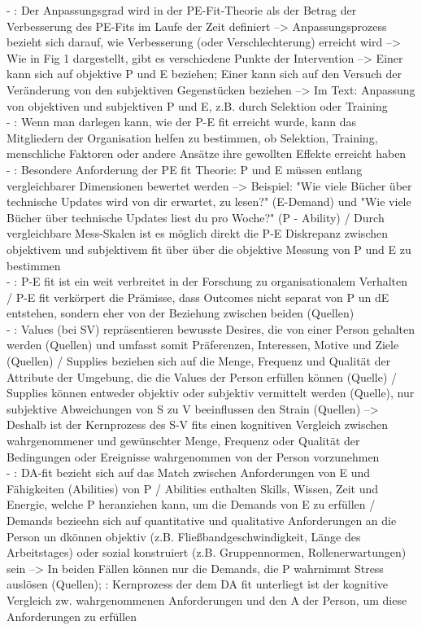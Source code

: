 - \cite[S. 4]{caplan:1987}: Der Anpassungsgrad wird in der PE-Fit-Theorie als der Betrag der Verbesserung des PE-Fits im Laufe der Zeit definiert --> Anpassungsprozess bezieht sich darauf, wie Verbesserung (oder Verschlechterung) erreicht wird --> Wie in Fig 1 dargestellt, gibt es verschiedene Punkte der Intervention --> Einer kann sich auf objektive P und E beziehen; Einer kann sich auf den Versuch der Veränderung von den subjektiven Gegenstücken beziehen --> Im Text: Anpassung von objektiven und subjektiven P und E, z.B. durch Selektion oder Training \\
- \cite[S. 4]{caplan:1987}: Wenn man darlegen kann, wie der P-E fit erreicht wurde, kann das Mitgliedern der Organisation helfen zu bestimmen, ob Selektion, Training, menschliche Faktoren oder andere Ansätze ihre gewollten Effekte erreicht haben\\
- \cite[S. 5]{caplan:1987}: Besondere Anforderung der PE fit Theorie: P und E müssen entlang vergleichbarer Dimensionen bewertet werden --> Beispiel: "Wie viele Bücher über technische Updates wird von dir erwartet, zu lesen?" (E-Demand) und "Wie viele Bücher über technische Updates liest du pro Woche?" (P - Ability) / Durch vergleichbare Mess-Skalen ist es möglich direkt die P-E Diskrepanz zwischen objektivem und subjektivem fit über über die objektive Messung von P und E zu bestimmen \\
- \cite[S. 1]{edwards:1996}: P-E fit ist ein weit verbreitet in der Forschung zu organisationalem Verhalten / P-E fit verkörpert die Prämisse, dass Outcomes nicht separat von P un dE entstehen, sondern eher von der Beziehung zwischen beiden (Quellen)\\
- \cite[S. 3]{edwards:1996}: Values (bei SV) repräsentieren bewusste Desires, die von einer Person gehalten werden (Quellen) und umfasst somit Präferenzen, Interessen, Motive und Ziele (Quellen) / Supplies beziehen sich auf die Menge, Frequenz und Qualität der Attribute der Umgebung, die die Values der Person erfüllen können (Quelle) / Supplies können entweder objektiv oder subjektiv vermittelt werden (Quelle), nur subjektive Abweichungen von S zu V beeinflussen den Strain (Quellen) --> Deshalb ist der Kernprozess des S-V fits einen kognitiven Vergleich zwischen wahrgenommener und gewünschter Menge, Frequenz oder Qualität der Bedingungen oder Ereignisse wahrgenommen von der Person vorzunehmen \\
- \cite[S. 5]{edwards:1996}: DA-fit bezieht sich auf das Match zwischen Anforderungen von E und Fähigkeiten (Abilities) von P / Abilities enthalten Skills, Wissen, Zeit und Energie, welche P heranziehen kann, um die Demands von E zu erfüllen / Demands bezieehn sich auf quantitative und qualitative Anforderungen an die Person un dkönnen objektiv (z.B. Fließbandgeschwindigkeit, Länge des Arbeitstages) oder sozial konstruiert (z.B. Gruppennormen, Rollenerwartungen) sein --> In beiden Fällen können nur die Demands, die P wahrnimmt Stress auslösen (Quellen); \cite[S. 5f.]{edwards:1996}: Kernprozess der dem DA fit unterliegt ist der kognitive Vergleich zw. wahrgenommenen Anforderungen und den A der Person, um diese Anforderungen zu erfüllen \\
